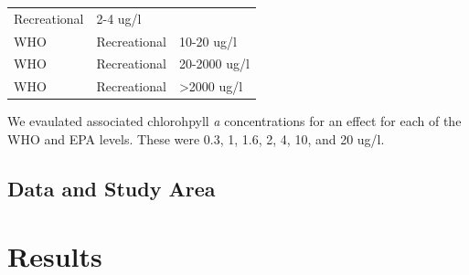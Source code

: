 \documentclass[11pt,]{article}
\begin{document}
\begin{longtable}[c]{@{}lll@{}}
\begin{minipage}[t]{0.16\columnwidth}
Recreational
\strut\end{minipage} &
\begin{minipage}[t]{0.19\columnwidth}\raggedright\strut
2-4 ug/l
\strut\end{minipage}\tabularnewline
\begin{minipage}[t]{0.11\columnwidth}\raggedright\strut
WHO
\strut\end{minipage} &
\begin{minipage}[t]{0.16\columnwidth}\raggedright\strut
Recreational
\strut\end{minipage} &
\begin{minipage}[t]{0.19\columnwidth}\raggedright\strut
10-20 ug/l
\strut\end{minipage}\tabularnewline
\begin{minipage}[t]{0.11\columnwidth}\raggedright\strut
WHO
\strut\end{minipage} &
\begin{minipage}[t]{0.16\columnwidth}\raggedright\strut
Recreational
\strut\end{minipage} &
\begin{minipage}[t]{0.19\columnwidth}\raggedright\strut
20-2000 ug/l
\strut\end{minipage}\tabularnewline
\begin{minipage}[t]{0.11\columnwidth}\raggedright\strut
WHO
\strut\end{minipage} &
\begin{minipage}[t]{0.16\columnwidth}\raggedright\strut
Recreational
\strut\end{minipage} &
\begin{minipage}[t]{0.19\columnwidth}\raggedright\strut
\textgreater{}2000 ug/l
\strut\end{minipage}\tabularnewline
\bottomrule
\end{longtable}

We evaulated associated chlorohpyll \emph{a} concentrations for an
effect for each of the WHO and EPA levels. These were 0.3, 1, 1.6, 2, 4,
10, and 20 ug/l.

\subsection{Data and Study Area}\label{data-and-study-area}

\section{Results}\label{results}
\end{document}
